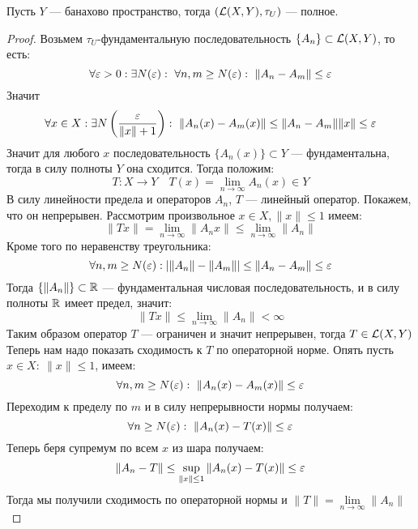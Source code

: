\begin{theorem}
	Пусть $Y$ --- банахово пространство, тогда $(\mathcal{L}(X,Y), \tau_U)$ --- полное.
\end{theorem}
\begin{proof}
	Возьмем $\tau_U$-фундаментальную последовательность $\{A_n\} \subset \mathcal{L}(X,Y)$, то есть:
	$$
	\forall \varepsilon > 0 : \exists N(\varepsilon): \ \forall n,m \geq N(\varepsilon): \ \|A_n -A_m\| \leq \varepsilon 
	$$
	Значит
	$$
	\forall x \in X: \exists N\left(\frac{\varepsilon}{\|x\| +1}\right) :\ \|A_n(x) - A_m(x)\| \leq \|A_n - A_m\| \|x\| \leq \varepsilon
	$$
	Значит для любого $x$ последовательность $\{A_n(x)\} \subset Y$ --- фундаментальна, тогда в силу полноты $Y$ она сходится.
	Тогда положим:
	$$
	T: X \to Y \quad T(x) = \lim\limits_{n \to \infty} A_n(x) \in Y
	$$
	В силу линейности предела и операторов $A_n$, $T$ --- линейный оператор. Покажем, что он непрерывен. Рассмотрим произвольное $x \in X, \|x\| \leq 1$ имеем:
	$$
	\|Tx\| = \lim\limits_{n \to \infty}{\|A_n x\|} \leq \lim\limits_{n \to \infty}\|A_n\|
	$$
	Кроме того по неравенству треугольника: 
	$$
	\forall n,m \geq N(\varepsilon): \left|\|A_n\| - \|A_m\|\right| \leq \|A_n - A_m\| \leq \varepsilon
	$$
	Тогда $\{\|A_n\|\} \subset \mathbb{R}$ --- фундаментальная числовая последовательность, и в силу полноты $\mathbb{R}$ имеет предел, значит: 
	$$
	\|Tx\| \leq \lim\limits_{n \to \infty} \|A_n\| < \infty
	$$
	Таким образом оператор $T$ --- ограничен и значит непрерывен, тогда $T \in \mathcal{L}(X, Y)$
	Теперь нам надо показать сходимость к $T$ по операторной норме. Опять пусть $x \in X: \ \|x\| \leq 1$, имеем:
	$$
	\forall n, m \geq N(\eps): \ \|A_n(x) - A_m(x)\| \leq \eps
	$$
	Переходим к пределу по $m$ и в силу непрерывности нормы получаем:
	$$
	\forall n \geq N(\varepsilon): \ \|A_n(x) - T(x)\| \leq \varepsilon 
	$$
	Теперь беря супремум по всем $x$ из шара получаем:
	$$
	\|A_n - T\|  \leq \sup\limits_{\|x\| \leq 1}\|A_n(x) - T(x)\| \leq \varepsilon
	$$
	Тогда мы получили сходимость по операторной нормы и $\|T\| = \lim\limits_{n \to \infty}\|A_n\|$
\end{proof}